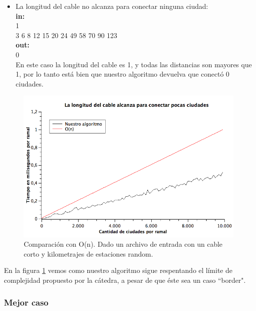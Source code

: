 \begin{itemize}
\item La longitud del cable no alcanza para conectar ninguna ciudad:\\
\textbf{in:}\\
1\\
3 6 8 12 15 20 24 49 58 70 90 123 \\
\textbf{out:}\\
0\\

En este caso la longitud del cable es 1, y todas las distancias son mayores que 1, por lo tanto está bien que nuestro algoritmo devuelva que conectó 0 ciudades.\\
\end{itemize}

\begin{figure}[H]
\begin{center}

  \includegraphics[width=\linewidth]{../graficos/ej1/CableCorto.png}
  \caption{{\small Comparación con O(n). Dado un archivo de entrada con un cable corto y kilometrajes de estaciones random.}} \label{ej1-tiempo-vs-cant-ciudades-random-long-cable-1}
\endminipage

\end{center}
\end{figure}

En la figura \ref{ej1-tiempo-vs-cant-ciudades-random-long-cable-1} vemos como nuestro algoritmo sigue respentando el límite de complejidad propuesto por la cátedra, a pesar de que éste sea un caso ``border". \\

\subsubsection{Mejor caso}

